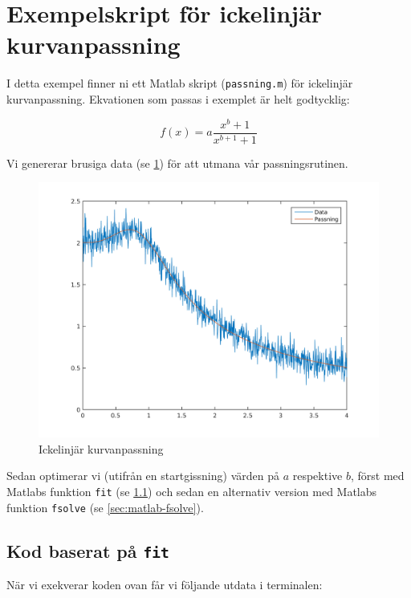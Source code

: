\section{Exempelskript för ickelinjär kurvanpassning}
\label{sec:matlab-nonlinear}
I detta exempel finner ni ett Matlab skript ({\tt passning.m}) för
ickelinjär kurvanpassning. Ekvationen som passas i exemplet är helt godtycklig:

\begin{equation}
  \label{eq:ex}
  f(x) = a\frac{x^b+1}{x^{b+1}+1}
\end{equation}

Vi genererar brusiga data  (se \cref{fig:matlab-nonlinear}) för att
utmana vår passningsrutinen.

\begin{figure}
  \centering
  \includegraphics[scale=0.5]{matlab/passning.png}
  \caption{Ickelinjär kurvanpassning}
  \label{fig:matlab-nonlinear}
\end{figure}

Sedan optimerar vi (utifrån en startgissning) värden på $a$ respektive
$b$, först med Matlabs funktion {\tt fit} (se \cref{sec:matlab-fit})
och sedan en alternativ version med Matlabs funktion {\tt fsolve} (se
\cref{sec:matlab-fsolve}).

\subsection{Kod baserat på {\tt fit}}
\label{sec:matlab-fit}


När vi exekverar koden ovan får vi följande utdata i terminalen:

